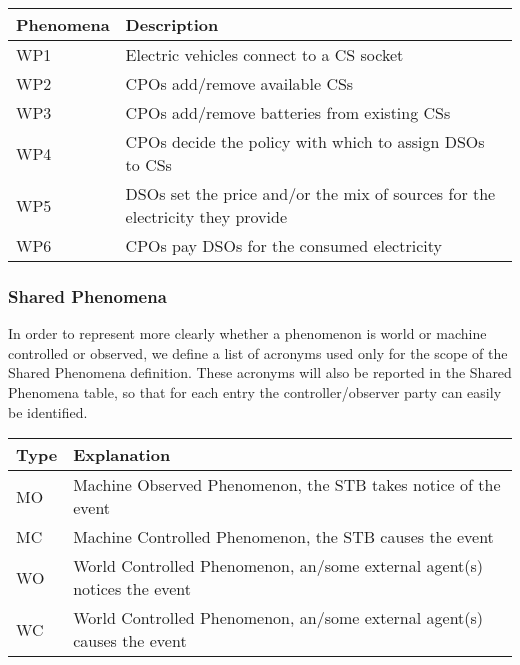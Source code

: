 \documentclass[11pt]{article}
\begin{document}
\begin{table}[H]
    \centering
    \setlength{\tabcolsep}{18pt}
    \renewcommand{\arraystretch}{1.2}
    \begin{tabularx}{\textwidth}{|>{\centering\hsize=0.3\hsize}X|>{\hsize=1.7\hsize}X|}
        \hline
        \textbf{Phenomena} & \textbf{Description} \\
        \hline
        WP1 & Electric vehicles connect to a CS socket \\
        \hline
        WP2 & CPOs add/remove available CSs \\
        \hline
        WP3 & CPOs add/remove batteries from existing CSs \\
        \hline
        WP4 & CPOs decide the policy with which to assign DSOs to CSs \\
        \hline
        WP5 & DSOs set the price and/or the mix of sources for the electricity they provide \\
        \hline
        WP6 & CPOs pay DSOs for the consumed electricity \\
        \hline
    \end{tabularx}
    \label{tab:world_phenomena}
\end{table}

\subsubsection{Shared Phenomena}

In order to represent more clearly whether a phenomenon is world or machine controlled or observed, we define a list of acronyms used only for the scope of the Shared Phenomena definition. These acronyms will also be reported in the Shared Phenomena table, so that for each entry the controller/observer party can easily be identified. 

\begin{table}[H]
    \centering
    \setlength{\tabcolsep}{18pt}
    \renewcommand{\arraystretch}{1.2}
    \begin{tabularx}{\textwidth}{|>{\centering\hsize=0.3\hsize}X|>{\hsize=1.7\hsize}X|}
        \hline
        \textbf{Type} & \textbf{Explanation} \\
        \hline
        MO & Machine Observed Phenomenon, the STB takes notice of the event \\
        \hline
        MC & Machine Controlled Phenomenon, the STB causes the event \\
        \hline
        WO & World Controlled Phenomenon, an/some external agent(s) notices the event \\
        \hline
        WC & World Controlled Phenomenon, an/some external agent(s) causes the event \\
        \hline
    \end{tabularx}
    \label{tab:shared_phenomena_header}
\end{table}
\end{document}
